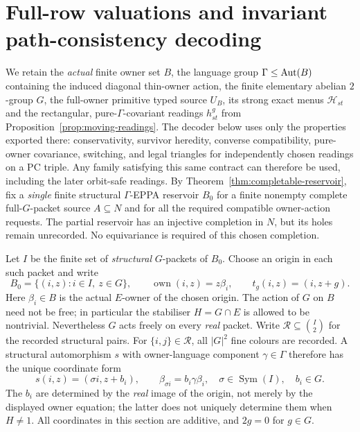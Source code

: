 \section{Full-row valuations and invariant path-consistency decoding}
\label{sec:full-rows}

We retain the \emph{actual} finite owner set $B$, the language group
$\Gamma\le\operatorname{Aut}(B)$ containing the induced diagonal thin-owner action,
the finite elementary abelian $2$-group $G$, the
full-owner primitive typed source $U_B$, its strong exact menus
$\mathcal H_{st}$ and the rectangular, pure-$\Gamma$-covariant
readings $h^g_{st}$ from
Proposition~\ref{prop:moving-readings}. The decoder below uses only
the properties exported there: conservativity, survivor heredity,
converse compatibility, pure-owner covariance, switching, and legal
triangles for independently chosen readings on a PC triple.
Any family satisfying this same contract can therefore be used,
including the later orbit-safe readings. By
Theorem~\ref{thm:completable-reservoir}, fix a \emph{single}
finite structural $\Gamma$-EPPA reservoir $B_0$ for a finite
nonempty complete full-$G$-packet source $A\subseteq N$ and for all
the required compatible owner-action requests.  The partial reservoir
has an injective completion in $N$, but its holes remain unrecorded.
No equivariance is required of this chosen completion.

Let $I$ be the finite set of \emph{structural} $G$-packets of $B_0$.
Choose an origin in each such packet and write
\[
 B_0=\{(i,z):i\in I,\ z\in G\},\qquad
 \operatorname{own}(i,z)=z\beta_i,
 \qquad t_g(i,z)=(i,z+g).
\]
Here $\beta_i\in B$ is the actual $E$-owner of the chosen origin.
The action of $G$ on $B$ need not be free; in particular the
stabiliser $H=G\cap E$ is allowed to be nontrivial.  Nevertheless
$G$ acts freely on every \emph{real} packet.  Write
$\mathcal R\subseteq\binom I2$ for the recorded structural pairs.
For $\{i,j\}\in\mathcal R$, all $|G|^2$ fine colours are recorded.
A structural automorphism $s$ with owner-language component
$\gamma\in\Gamma$ therefore has the unique coordinate form
\begin{equation}\label{eq:R07-structural}
 s(i,z)=(\sigma i,z+b_i),\qquad
 \beta_{\sigma i}=b_i\gamma\beta_i,
 \quad \sigma\in\operatorname{Sym}(I),\quad b_i\in G.
\end{equation}
The $b_i$ are determined by the \emph{real} image of the origin,
not merely by the displayed owner equation; the latter does not
uniquely determine them when $H\ne 1$.
All coordinates in this section are additive, and $2g=0$ for $g\in G$.

